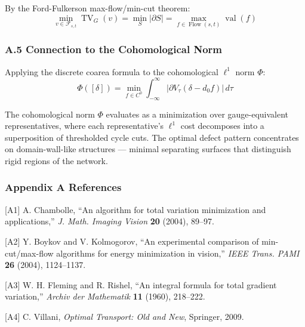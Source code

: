 \documentclass[
]{article}
\begin{document}
By the Ford-Fulkerson max-flow/min-cut theorem:
\[ \min_{v \in \mathcal{F}_{s,t}} \operatorname{TV}_G(v) = \min_S |\partial S| = \max_{f \in \operatorname{Flow}(s,t)} \operatorname{val}(f) \]

\subsubsection{A.5 Connection to the Cohomological
Norm}\label{a.5-connection-to-the-cohomological-norm}

Applying the discrete coarea formula to the cohomological \(\ell^1\)
norm \(\Phi\):
\[ \Phi([\delta]) = \min_{f \in C^0} \int_{-\infty}^{\infty} |\partial V_\tau(\delta - d_0 f)| \, d\tau \]

The cohomological norm \(\Phi\) evaluates as a minimization over
gauge-equivalent representatives, where each representative's \(\ell^1\)
cost decomposes into a superposition of thresholded cycle cuts. The
optimal defect pattern concentrates on domain-wall-like structures ---
minimal separating surfaces that distinguish rigid regions of the
network.

\subsubsection{Appendix A References}\label{appendix-a-references}

{[}A1{]} A. Chambolle, ``An algorithm for total variation minimization
and applications,'' \emph{J. Math. Imaging Vision} \textbf{20} (2004),
89--97.

{[}A2{]} Y. Boykov and V. Kolmogorov, ``An experimental comparison of
min-cut/max-flow algorithms for energy minimization in vision,''
\emph{IEEE Trans. PAMI} \textbf{26} (2004), 1124--1137.

{[}A3{]} W. H. Fleming and R. Rishel, ``An integral formula for total
gradient variation,'' \emph{Archiv der Mathematik} \textbf{11} (1960),
218--222.

{[}A4{]} C. Villani, \emph{Optimal Transport: Old and New}, Springer,
2009.
\end{document}
